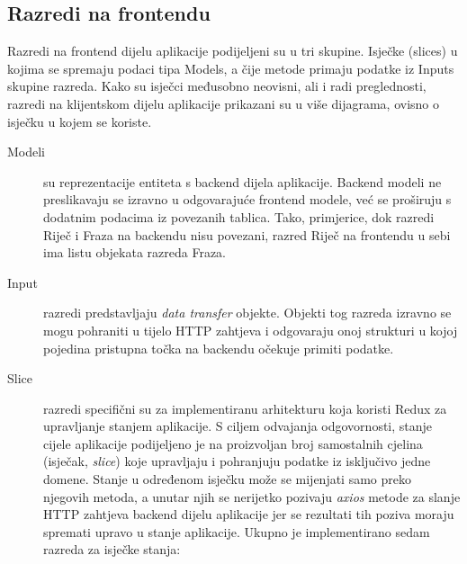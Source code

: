 \subsection{Razredi na frontendu}

Razredi na frontend dijelu aplikacije podijeljeni su u tri skupine. Isječke (slices) u kojima se spremaju podaci tipa Models, a čije metode primaju podatke iz Inputs skupine razreda. Kako su isječci međusobno neovisni, ali i radi preglednosti, razredi na klijentskom dijelu aplikacije prikazani su u više dijagrama, ovisno o isječku u kojem se koriste.
\begin{description}
	\item[Modeli] su reprezentacije entiteta s backend dijela aplikacije. Backend modeli ne preslikavaju se izravno u odgovarajuće frontend modele, već se proširuju s dodatnim podacima iz povezanih tablica. Tako, primjerice, dok razredi Riječ i Fraza na backendu nisu povezani, razred Riječ na frontendu u sebi ima listu objekata razreda Fraza.
	\item[Input] razredi predstavljaju \textit{data transfer} objekte. Objekti tog razreda izravno se mogu pohraniti u tijelo HTTP zahtjeva i odgovaraju onoj strukturi u kojoj  pojedina pristupna točka na backendu očekuje primiti podatke.
	\item[Slice] razredi specifični su za implementiranu arhitekturu koja koristi Redux za upravljanje stanjem aplikacije. S ciljem odvajanja odgovornosti, stanje cijele aplikacije podijeljeno je na proizvoljan broj samostalnih cjelina (isječak, \textit{slice}) koje upravljaju i pohranjuju podatke iz isključivo jedne domene. Stanje u određenom isječku može se mijenjati samo preko njegovih metoda, a unutar njih se nerijetko pozivaju \textit{axios} metode za slanje HTTP zahtjeva backend dijelu aplikacije jer se rezultati tih poziva moraju spremati upravo u stanje aplikacije. Ukupno je implementirano sedam razreda za isječke stanja:
	
	
\end{description}

